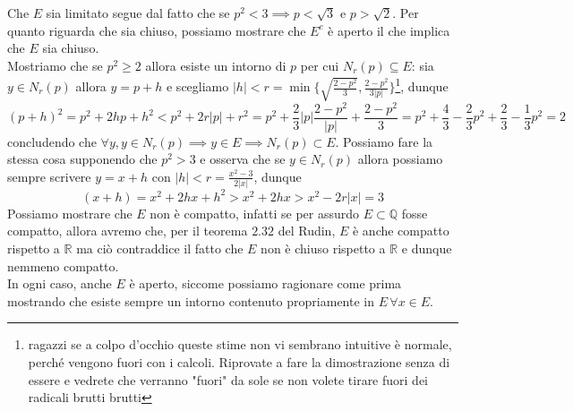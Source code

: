 \documentclass{report}
\begin{document}
\begin{mysolution}
	Che $E$ sia limitato segue dal fatto che se $p^2 < 3 \implies p < \sqrt{3}$ e $p > \sqrt{2}$. Per quanto riguarda che sia chiuso, possiamo mostrare che $E^c$ è aperto il che implica che $E$ sia chiuso. \\
	Mostriamo che se $p^2 \geq 2$ allora esiste un intorno di $p$ per cui $N_r(p) \subseteq E$: sia $y \in N_r(p)$ allora $y = p+h$ e scegliamo $|h| < r=\min\{\sqrt{\frac{2-p^2}{3}}, \frac{2-p^2}{3|p|}\}$\footnote{ragazzi se a colpo d'occhio queste stime non vi sembrano intuitive è normale, perché vengono fuori con i calcoli. Riprovate a fare la dimostrazione senza di essere e vedrete che verranno "fuori" da sole se non volete tirare fuori dei radicali brutti brutti}, dunque $$
(p+h)^2 = p^2 + 2hp + h^2 < p^2 + 2r |p| + r^2 = p^2 + \frac{2}{3} |p| \frac{2-p^2}{|p|} + \frac{2-p^2}{3} = p^2 + \frac{4}{3} - \frac{2}{3}p^2 + \frac{2}{3} - \frac{1}{3}p^2 = 2	
$$
concludendo che $\forall y, y \in N_r(p) \implies y \in E \implies N_r(p) \subset E$. Possiamo fare la stessa cosa supponendo che $p^2 > 3$ e osserva che se $y \in N_r(p)$ allora possiamo sempre scrivere $y=x+h$ con $|h| < r=\frac{x^2-3}{2|x|}$, dunque
$$
(x+h) = x^2 + 2hx + h^2 > x^2 + 2hx > x^2 - 2 r |x| = 3
$$
\noindent Possiamo mostrare che $E$ non è compatto, infatti se per assurdo $E \subset \mathbb{Q}$ fosse compatto, allora avremo che, per il teorema $2.32$ del Rudin, $E$ è anche compatto rispetto a $\mathbb{R}$ ma ciò contraddice il fatto che $E$ non è chiuso rispetto a $\mathbb{R}$ e dunque nemmeno compatto. \\
	In ogni caso, anche $E$ è aperto, siccome possiamo ragionare come prima mostrando che esiste sempre un intorno contenuto propriamente in $E \, \forall x \in E$.
\end{mysolution}
\end{document}
